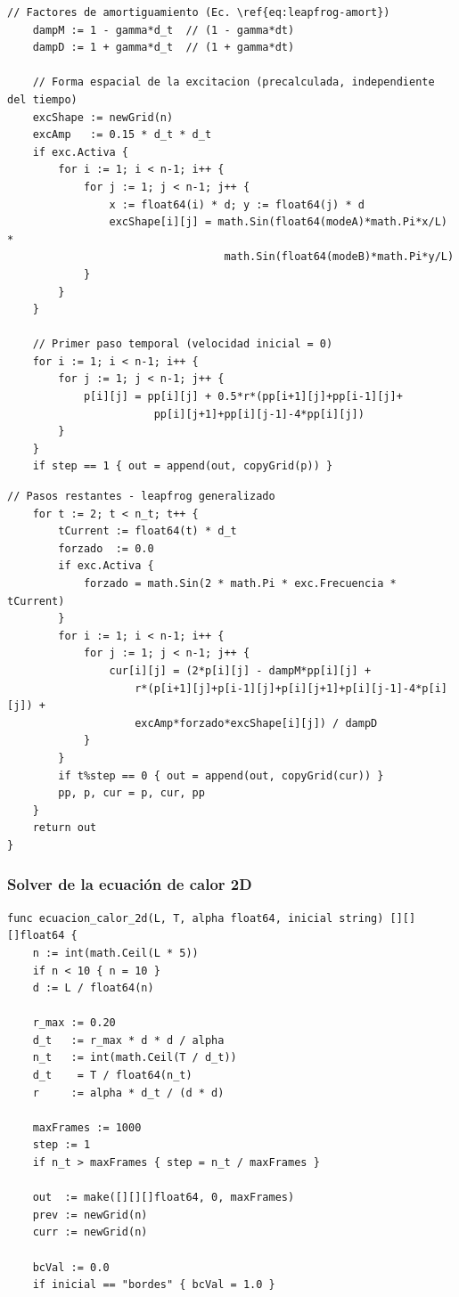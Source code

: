 \documentclass[12pt, a4paper]{article}
\begin{document}
\begin{lstlisting}[style=golang, caption={Amortiguamiento, excitación y primer paso temporal}]
    // Factores de amortiguamiento (Ec. \ref{eq:leapfrog-amort})
    dampM := 1 - gamma*d_t  // (1 - gamma*dt)
    dampD := 1 + gamma*d_t  // (1 + gamma*dt)

    // Forma espacial de la excitacion (precalculada, independiente del tiempo)
    excShape := newGrid(n)
    excAmp   := 0.15 * d_t * d_t
    if exc.Activa {
        for i := 1; i < n-1; i++ {
            for j := 1; j < n-1; j++ {
                x := float64(i) * d; y := float64(j) * d
                excShape[i][j] = math.Sin(float64(modeA)*math.Pi*x/L) *
                                  math.Sin(float64(modeB)*math.Pi*y/L)
            }
        }
    }

    // Primer paso temporal (velocidad inicial = 0)
    for i := 1; i < n-1; i++ {
        for j := 1; j < n-1; j++ {
            p[i][j] = pp[i][j] + 0.5*r*(pp[i+1][j]+pp[i-1][j]+
                       pp[i][j+1]+pp[i][j-1]-4*pp[i][j])
        }
    }
    if step == 1 { out = append(out, copyGrid(p)) }
\end{lstlisting}

\begin{lstlisting}[style=golang, caption={Avance temporal del esquema de onda}]
    // Pasos restantes - leapfrog generalizado
    for t := 2; t < n_t; t++ {
        tCurrent := float64(t) * d_t
        forzado  := 0.0
        if exc.Activa {
            forzado = math.Sin(2 * math.Pi * exc.Frecuencia * tCurrent)
        }
        for i := 1; i < n-1; i++ {
            for j := 1; j < n-1; j++ {
                cur[i][j] = (2*p[i][j] - dampM*pp[i][j] +
                    r*(p[i+1][j]+p[i-1][j]+p[i][j+1]+p[i][j-1]-4*p[i][j]) +
                    excAmp*forzado*excShape[i][j]) / dampD
            }
        }
        if t%step == 0 { out = append(out, copyGrid(cur)) }
        pp, p, cur = p, cur, pp
    }
    return out
}
\end{lstlisting}

\subsubsection{Solver de la ecuación de calor 2D}

\begin{lstlisting}[style=golang, caption={Parámetros y discretización del solver de calor}, label=lst:calor2d]
func ecuacion_calor_2d(L, T, alpha float64, inicial string) [][][]float64 {
    n := int(math.Ceil(L * 5))
    if n < 10 { n = 10 }
    d := L / float64(n)

    r_max := 0.20
    d_t   := r_max * d * d / alpha
    n_t   := int(math.Ceil(T / d_t))
    d_t    = T / float64(n_t)
    r     := alpha * d_t / (d * d)

    maxFrames := 1000
    step := 1
    if n_t > maxFrames { step = n_t / maxFrames }

    out  := make([][][]float64, 0, maxFrames)
    prev := newGrid(n)
    curr := newGrid(n)

    bcVal := 0.0
    if inicial == "bordes" { bcVal = 1.0 }
\end{lstlisting}
\end{document}
